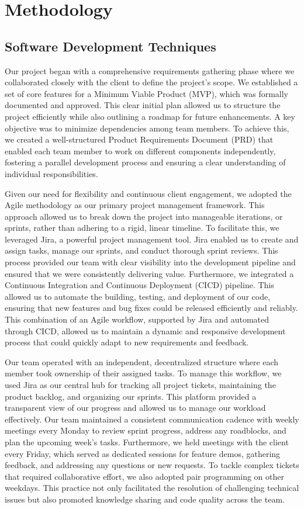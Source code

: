 
\chapter{Methodology}
\section{Software Development Techniques}
Our project began with a comprehensive requirements gathering phase where we collaborated closely with the client to define the project's scope. We established a set of core features for a Minimum Viable Product (MVP), which was formally documented and approved. This clear initial plan allowed us to structure the project efficiently while also outlining a roadmap for future enhancements. A key objective was to minimize dependencies among team members. To achieve this, we created a well-structured Product Requirements Document (PRD) that enabled each team member to work on different components independently, fostering a parallel development process and ensuring a clear understanding of individual responsibilities.

Given our need for flexibility and continuous client engagement, we adopted the Agile methodology as our primary project management framework. This approach allowed us to break down the project into manageable iterations, or sprints, rather than adhering to a rigid, linear timeline. To facilitate this, we leveraged Jira, a powerful project management tool. Jira enabled us to create and assign tasks, manage our sprints, and conduct thorough sprint reviews. This process provided our team with clear visibility into the development pipeline and ensured that we were consistently delivering value. Furthermore, we integrated a Continuous Integration and Continuous Deployment (CICD) pipeline. This allowed us to automate the building, testing, and deployment of our code, ensuring that new features and bug fixes could be released efficiently and reliably. This combination of an Agile workflow, supported by Jira and automated through CICD, allowed us to maintain a dynamic and responsive development process that could quickly adapt to new requirements and feedback.

Our team operated with an independent, decentralized structure where each member took ownership of their assigned tasks. To manage this workflow, we used Jira as our central hub for tracking all project tickets, maintaining the product backlog, and organizing our sprints. This platform provided a transparent view of our progress and allowed us to manage our workload effectively. Our team maintained a consistent communication cadence with weekly meetings every Monday to review sprint progress, address any roadblocks, and plan the upcoming week's tasks. Furthermore, we held meetings with the client every Friday, which served as dedicated sessions for feature demos, gathering feedback, and addressing any questions or new requests. To tackle complex tickets that required collaborative effort, we also adopted pair programming on other weekdays. This practice not only facilitated the resolution of challenging technical issues but also promoted knowledge sharing and code quality across the team.

